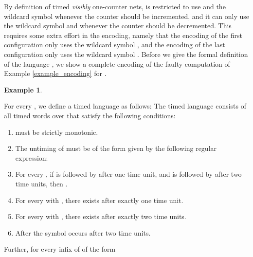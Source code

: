 \documentclass{CSML}
\theoremstyle{plain}\newtheorem{theorem}[thm]{Theorem}
\theoremstyle{plain}\newtheorem{corollary}[thm]{Corollary}
\theoremstyle{plain}\newtheorem{example}[thm]{Example}
\theoremstyle{plain}\newtheorem{lemma}[thm]{Lemma}
\theoremstyle{plain}\newtheorem{remark}[thm]{Remark}
\begin{document}
By definition of timed \emph{visibly} one-counter nets,  is restricted to use  and the wildcard symbol  whenever the counter should be incremented, and it can only use the wildcard symbol  and  whenever the counter should be decremented.  
This requires some extra effort in the encoding, namely that the encoding of the first configuration only uses the wildcard symbol , and the encoding of the last configuration only uses the wildcard symbol . 
Before we give the formal definition of the language , 
we show a complete encoding of the faulty computation of Example \ref{example_encoding} for .
\begin{example}
	\label{example_thewholeenc}
	
	
	
\end{example}
For every , we define a timed language   as follows: 
The timed language  consists of all timed words  over  that satisfy the following conditions:
\begin{enumerate}
\item  must be strictly monotonic. 
	
\item The untiming of  must be of the form given by the following regular expression: 
	
\item For every , if  is followed by  after one time unit, and  is followed by  after two time units, then . 
	
	
\item For every  with , there exists  after exactly one time unit. 
	
\item For every  with , there exists  after exactly two time units.
	
\item After   the symbol  occurs after two time units.
	
	
\end{enumerate}
Further,
for every infix of  of the form
\end{document}
